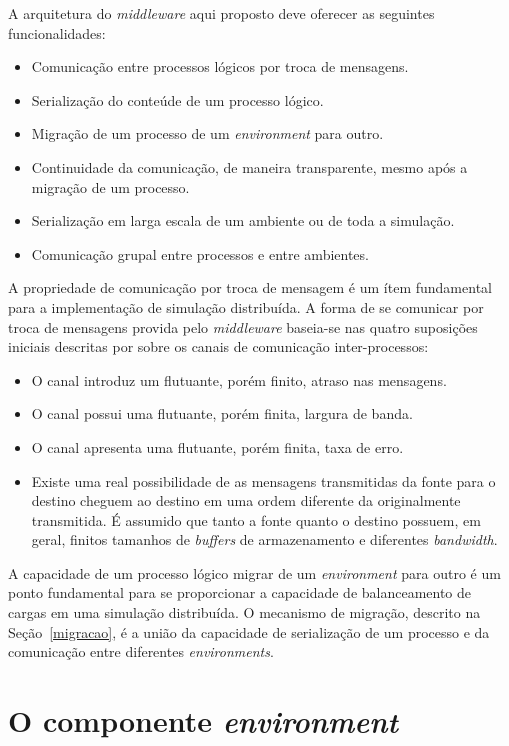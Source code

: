 A arquitetura do \textit{middleware} aqui proposto deve oferecer as seguintes funcionalidades:
 
\begin{itemize}
\item Comunicação entre processos lógicos por troca de mensagens.
\item Serialização do conteúde de um processo lógico.
\item Migração de um processo de um \textit{environment} para outro.
\item Continuidade da comunicação, de maneira transparente, mesmo após a migração de um processo.
\item Serialização em larga escala de um ambiente ou de toda a simulação.
\item Comunicação grupal entre processos e entre ambientes.
\end{itemize}

A propriedade de comunicação por troca de mensagem é um ítem fundamental para a implementação de simulação distribuída. A forma de se comunicar por troca de mensagens provida pelo \textit{middleware} baseia-se nas quatro suposições iniciais descritas por \cite{MCQUILLAN75} sobre os canais de comunicação inter-processos:

\begin{itemize}
\item O canal introduz um flutuante, porém finito, atraso nas mensagens.
\item O canal possui uma flutuante, porém finita, largura de banda.
\item O canal apresenta uma flutuante, porém finita, taxa de erro.
\item Existe uma real possibilidade de as mensagens transmitidas da fonte para o destino cheguem ao destino em uma ordem diferente da originalmente transmitida. É assumido que tanto a fonte quanto o destino possuem, em geral, finitos tamanhos de \textit{buffers} de armazenamento e diferentes \textit{bandwidth}.
\end{itemize}

A capacidade de um processo lógico migrar de um \textit{environment} para outro é um ponto fundamental para se proporcionar a capacidade de balanceamento de cargas em uma simulação distribuída. O mecanismo de migração, descrito na Seção~\ref{migracao}, é a união da capacidade de serialização de um processo e da comunicação entre diferentes \textit{environments}.

\section{O componente \textit{environment}}

